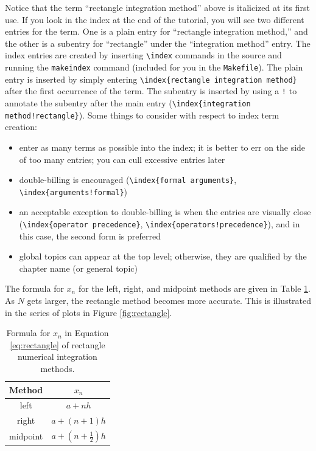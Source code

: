 \begin{seamlessnote}
  Notice that the term ``rectangle integration method'' above is italicized at its first use. If you look 
  in the index at the end of the tutorial, you will see two different entries for the term. 
  One is a plain entry for ``rectangle
  integration method,'' and the other is a subentry for ``rectangle'' under the ``integration method'' entry. 
  The index entries are created by inserting \verb|\index| commands in the \latex source and running
  the \verb|makeindex| command (included for you in the \verb|Makefile|). The plain entry
  is inserted by simply entering \verb!\index{rectangle integration method}! after the first
  occurrence of the term. The subentry is inserted by using a \verb|!| to annotate the subentry after the main entry
  (\eg \verb|\index{integration method!rectangle}|).  Some things to consider with respect to
  index term creation:
  \begin{itemize}
    \item enter as many terms as possible into the index; it is better to err on the side of too 
      many entries; you can cull excessive entries later
    \item double-billing is encouraged (\eg \verb|\index{formal arguments}|, 
      \\ \verb|\index{arguments!formal}|)
    \item an acceptable exception to double-billing is when the entries are visually close 
      \\ (\eg \verb|\index{operator precedence}|, \verb|\index{operators!precedence}|), and
      in this case, the second form is preferred
    \item global topics can appear at the top level; otherwise, they are qualified by
      the chapter name (or general topic)
  \end{itemize}
\end{seamlessnote}

The formula for $x_n$ for the left, right, and midpoint methods are given in Table \ref{tab:xn-rectangle}.
As $N$ gets larger, the rectangle method becomes more accurate. This is illustrated in the series of plots
in Figure \ref{fig:rectangle}.

\begin{table}[htbp]
  \centering
  \caption{Formula for $x_n$ in Equation \ref{eq:rectangle} of 
  rectangle numerical integration methods.} 
  \label{tab:xn-rectangle}
  \begin{tabular}{cc}
    \textbf{Method} & \textbf{$x_n$} \\ \toprule
    left & $a+nh$ \\ \midrule
    right & $a+(n+1)h$ \\ \midrule
    midpoint & $a+\left(n + \frac{1}{2}\right)h$ \\ \bottomrule
  \end{tabular}
\end{table}

